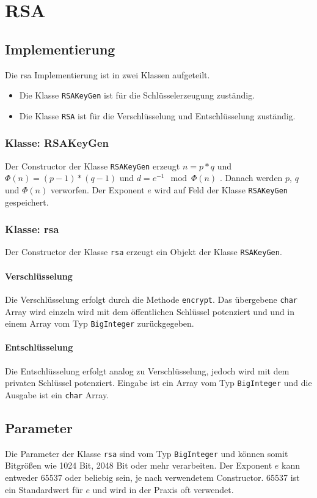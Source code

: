 \chapter{RSA}

\section{Implementierung}
Die \gls{rsa} Implementierung ist in zwei Klassen aufgeteilt.
\begin{itemize}
	\item Die Klasse \texttt{RSAKeyGen} ist für die Schlüsselerzeugung zuständig.
	\item Die Klasse \texttt{RSA} ist für die Verschlüsselung und Entschlüsselung zuständig.
\end{itemize}

\subsection{Klasse: RSAKeyGen}
Der Constructor der Klasse \texttt{RSAKeyGen} erzeugt $n = p*q$ und $\Phi(n) = (p-1)*(q-1)$ und $d = e^{-1} \mod \Phi(n)$ \cite{rfc8017}. Danach werden $p$, $q$ und $\Phi(n)$ verworfen. Der Exponent $e$ wird auf Feld der Klasse \texttt{RSAKeyGen} gespeichert.

\subsection{Klasse: \gls{rsa}}
Der Constructor der Klasse \texttt{\gls{rsa}} erzeugt ein Objekt der Klasse \texttt{RSAKeyGen}.

\subsubsection{Verschlüsselung}
Die Verschlüsselung erfolgt durch die Methode \texttt{encrypt}. Das übergebene \texttt{char} Array wird einzeln wird mit dem öffentlichen Schlüssel potenziert \cite{rfc8017} und und in einem Array vom Typ \texttt{BigInteger} zurückgegeben.

\subsubsection{Entschlüsselung}
Die Entschlüsselung erfolgt analog zu Verschlüsselung, jedoch wird mit dem privaten Schlüssel potenziert. Eingabe ist ein Array vom Typ \texttt{BigInteger} und die Ausgabe ist ein \texttt{char} Array.

\section{Parameter}
Die Parameter der Klasse \texttt{\gls{rsa}} sind vom Typ \texttt{BigInteger} und können somit Bitgrößen wie 1024 Bit, 2048 Bit oder mehr verarbeiten. Der Exponent $e$ kann entweder 65537 oder beliebig sein, je nach verwendetem Constructor. 65537 ist ein Standardwert für $e$ und wird in der Praxis oft verwendet.

